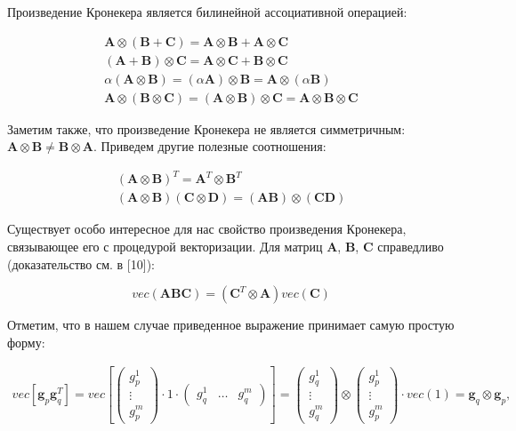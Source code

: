 Произведение Кронекера является билинейной ассоциативной операцией:

\begin{gather}
     \mathbf{A} \otimes (\mathbf{B} + \mathbf{C}) = \mathbf{A} \otimes \mathbf{B} + \mathbf{A} \otimes \mathbf{C} \\
    (\mathbf{A} + \mathbf{B}) \otimes \mathbf{C} = \mathbf{A} \otimes \mathbf{C} + \mathbf{B} \otimes \mathbf{C} \\
    \alpha(\mathbf{A} \otimes \mathbf{B}) = (\alpha\mathbf{A}) \otimes \mathbf{B} = \mathbf{A} \otimes (\alpha\mathbf{B}) \\
    \mathbf{A} \otimes(\mathbf{B} \otimes \mathbf{C}) =
   (\mathbf{A} \otimes \mathbf{B})\otimes \mathbf{C} =
    \mathbf{A} \otimes \mathbf{B} \otimes \mathbf{C}
\end{gather}

Заметим также, что произведение Кронекера не является симметричным: $\mathbf{A} \otimes \mathbf{B} \neq \mathbf{B} \otimes \mathbf{A}$.
Приведем другие полезные соотношения:

\begin{gather}
    (\mathbf{A} \otimes \mathbf{B})^T = \mathbf{A}^T \otimes \mathbf{B}^T \\
    (\mathbf{A} \otimes \mathbf{B}) (\mathbf{C} \otimes \mathbf{D}) = (\mathbf{A} \mathbf{B}) \otimes (\mathbf{C} \mathbf{D})
\end{gather}

Существует особо интересное для нас свойство произведения Кронекера, связывающее его с процедурой векторизации.
Для матриц $\mathbf{A}$, $\mathbf{B}$, $\mathbf{C}$ справедливо (доказательство см. в [10]):

\begin{equation}
    vec(\mathbf{A} \mathbf{B} \mathbf{C}) = (\mathbf{C}^T \otimes \mathbf{A}) vec(\mathbf{C})
\end{equation}

Отметим, что в нашем случае приведенное выражение принимает самую простую форму:

\begin{gather}
    vec[\mathbf{g}_p \mathbf{g}_q^T] = vec\left[
        \begin{pmatrix}
            g_p^1 \\
            \vdots \\
            g_p^m
        \end{pmatrix}
    \cdot 1 \cdot
    \begin{pmatrix}
        g_q^1 & \dots & g_q^m
    \end{pmatrix}
    \right] = %
    \begin{pmatrix}
        g_q^1 \\
        \vdots \\
        g_q^m
    \end{pmatrix}
    \otimes
    \begin{pmatrix}
        g_p^1 \\
        \vdots \\
        g_p^m
    \end{pmatrix}
    \cdot
    vec(1) =
    \mathbf{g}_q \otimes \mathbf{g}_p,
\end{gather}

